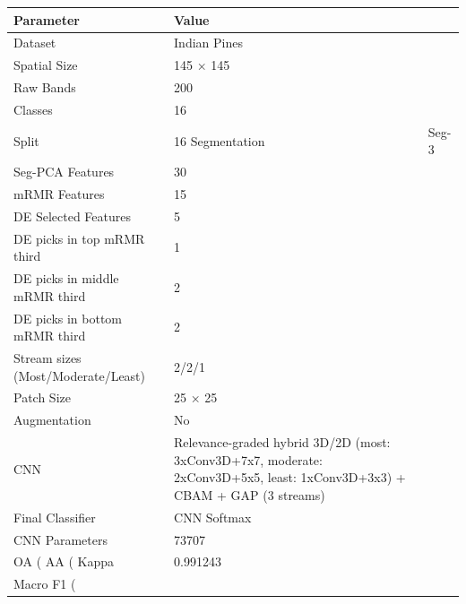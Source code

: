 \begin{tabular}{ll}
\toprule
Parameter & Value \\
\midrule
Dataset & Indian Pines \\
Spatial Size & 145 × 145 \\
Raw Bands & 200 \\
Classes & 16 \\
Split & 16%
Segmentation & Seg-3 \\
Seg-PCA Features & 30 \\
mRMR Features & 15 \\
DE Selected Features & 5 \\
DE picks in top mRMR third & 1 \\
DE picks in middle mRMR third & 2 \\
DE picks in bottom mRMR third & 2 \\
Stream sizes (Most/Moderate/Least) & 2/2/1 \\
Patch Size & 25 × 25 \\
Augmentation & No \\
CNN & Relevance-graded hybrid 3D/2D (most: 3xConv3D+7x7, moderate: 2xConv3D+5x5, least: 1xConv3D+3x3) + CBAM + GAP (3 streams) \\
Final Classifier & CNN Softmax \\
CNN Parameters & 73707 \\
OA (%
AA (%
Kappa & 0.991243 \\
Macro F1 (%
\bottomrule
\end{tabular}
